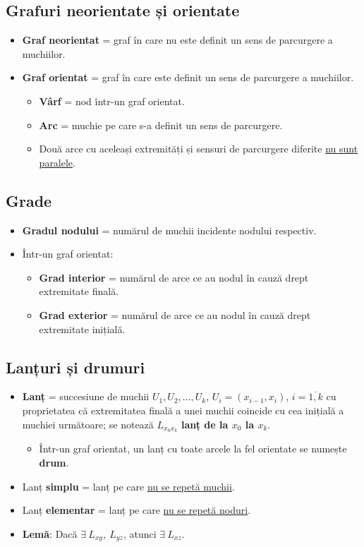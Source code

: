 \documentclass{article}
\begin{document}
\subsection*{Grafuri neorientate și orientate}
\begin{itemize}
    \item \textbf{Graf neorientat} = graf în care nu este definit un sens de parcurgere a muchiilor.
    \item \textbf{Graf orientat} = graf în care este definit un sens de parcurgere a muchiilor.
    \begin{itemize}
        \item \textbf{Vârf} = nod într-un graf orientat.
        \item \textbf{Arc} = muchie pe care s-a definit un sens de parcurgere.
        \item Două arce cu aceleași extremități și sensuri de parcurgere diferite \underline{nu sunt paralele}.
    \end{itemize}
\end{itemize}
\subsection*{Grade}
\begin{itemize}
    \item \textbf{Gradul nodului} = numărul de muchii incidente nodului respectiv.
    \item Într-un graf orientat: \begin{itemize}
        \item \textbf{Grad interior} = numărul de arce ce au nodul în cauză drept extremitate finală.
        \item \textbf{Grad exterior} = numărul de arce ce au nodul în cauză drept extremitate inițială.
    \end{itemize}
\end{itemize}
\subsection*{Lanțuri și drumuri}
\begin{itemize}
    \item \textbf{Lanț} = succesiune de muchii $U_1, U_2,...,U_k$, $U_i = (x_{i-1}, x_i)$, $i=\overline{1, k}$ cu proprietatea că extremitatea finală a unei muchii coincide cu cea inițială a muchiei următoare; se notează $L_{x_0 x_k}$ \textbf{lanț de la $x_0$ la $x_k$}.
    \begin{itemize}
        \item Într-un graf orientat, un lanț cu toate arcele la fel orientate se numește \textbf{drum}.
    \end{itemize}
    \item Lanț \textbf{simplu} = lanț pe care \underline{nu se repetă muchii}.
    \item Lanț \textbf{elementar} = lanț pe care \underline{nu se repetă noduri}.
    \item \textbf{Lemă}: Dacă $\exists\ L_{x y},\ L_{y z}$, atunci $\exists\ L_{x z}$.
\end{itemize}
\end{document}
